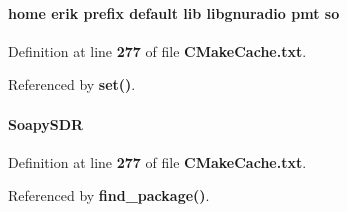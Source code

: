 \paragraph[{so}]{\setlength{\rightskip}{0pt plus 5cm}home erik prefix default lib libgnuradio {\bf pmt} so}\label{soapysdr_2build_2CMakeCache_8txt_ac9ba481770d248256ea834b11e21b5ab}


Definition at line {\bf 277} of file {\bf C\+Make\+Cache.\+txt}.



Referenced by {\bf set()}.

\paragraph[{Soapy\+S\+DR}]{\setlength{\rightskip}{0pt plus 5cm}Soapy\+S\+DR}\label{soapysdr_2build_2CMakeCache_8txt_a3d32f99f34130180fe77231666ad5c4f}


Definition at line {\bf 277} of file {\bf C\+Make\+Cache.\+txt}.



Referenced by {\bf find\+\_\+package()}.

